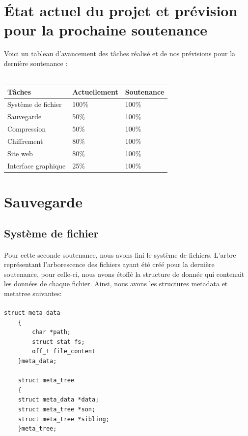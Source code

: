 \section{État actuel du projet et prévision pour la prochaine soutenance}
        
        Voici un tableau d'avancement des tâches réalisé et de nos prévisions pour la dernière soutenance : \\ \\
    
        {\normalsize
    	\begin{tabular}{|p{7cm}|p{2.4cm}|p{2.4cm}|}
    		\hline
    		Tâches & Actuellement & Soutenance \no 3 \\
    		\hline
    		Système de fichier & 100\% & 100\% \\
    		\hline
    		Sauvegarde & 50\% & 100\% \\
    		\hline
    		Compression & 50\% & 100\% \\
    		\hline
    		Chiffrement & 80\% & 100\% \\
    		\hline
    		Site web & 80\% & 100\% \\
    		\hline
    		Interface graphique & 25\% & 100\% \\
    		\hline
    	\end{tabular}
    	\label{répartition}}

\newpage

\section{Sauvegarde}
    
    \subsection{Système de fichier}
        \paragraph*{}
        Pour cette seconde soutenance, nous avons fini le système de fichiers. L'arbre représentant l'arborescence des fichiers ayant été créé pour la dernière soutenance, pour celle-ci, nous avons étoffé la structure de donnée qui contenait les données de chaque fichier. Ainsi, nous avons les structures metadata et metatree suivantes:
        
        \paragraph*{}
        \begin{lstlisting}[style=CStyle]
    struct meta_data
    {
        char *path;
        struct stat fs;
        off_t file_content
    }meta_data;
    
    struct meta_tree
    {
    struct meta_data *data;
    struct meta_tree *son;
    struct meta_tree *sibling;
    }meta_tree;
		\end{lstlisting}
        

